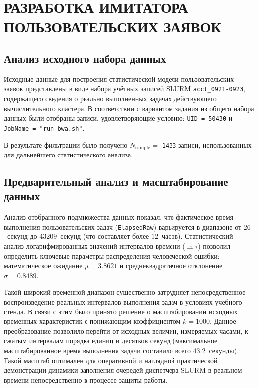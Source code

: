 \newpage
\section{РАЗРАБОТКА ИМИТАТОРА ПОЛЬЗОВАТЕЛЬСКИХ ЗАЯВОК}

\subsection{Анализ исходного набора данных}

Исходные данные для построения статистической модели пользовательских
заявок представлены в виде набора учётных записей SLURM
\texttt{acct\_0921-0923}, содержащего сведения о реально выполненных
задачах действующего вычислительного кластера. В соответствии с
вариантом задания из общего набора данных были отобраны записи,
удовлетворяющие условию: \texttt{UID = 50430} и
\texttt{JobName = "run\_bwa.sh"}.

В результате фильтрации было получено $N_{\text{sample}} = $ \texttt{1433}
записи, использованных для дальнейшего статистического анализа.

\subsection{Предварительный анализ и масштабирование данных}

Анализ отобранного подмножества данных показал, что фактическое время
выполнения пользовательских задач (\texttt{ElapsedRaw}) варьируется в диапазоне 
от $26$~секунд до $43209$~секунд (что составляет более $12$~часов). Статистический 
анализ логарифмированных значений интервалов времени ($\ln\tau$) позволил определить 
ключевые параметры распределения человеческой ошибки: математическое ожидание 
$\mu = 3.8621$ и среднеквадратичное отклонение $\sigma = 0.8489$.

Такой широкий временной диапазон существенно затрудняет непосредственное 
воспроизведение реальных интервалов выполнения задач в условиях учебного стенда. 
В связи с этим было принято решение о масштабировании исходных временных 
характеристик с понижающим коэффициентом $k = 1000$. Данное преобразование позволило 
перейти от исходных величин, измеряемых часами, к сжатым интервалам порядка единиц 
и десятков секунд (максимальное масштабированное время выполнения задачи составило всего 
$43.2$~секунды). Такой масштаб оптимален для оперативной и наглядной практической 
демонстрации динамики заполнения очередей диспетчера SLURM в реальном времени непосредственно 
в процессе защиты работы.

